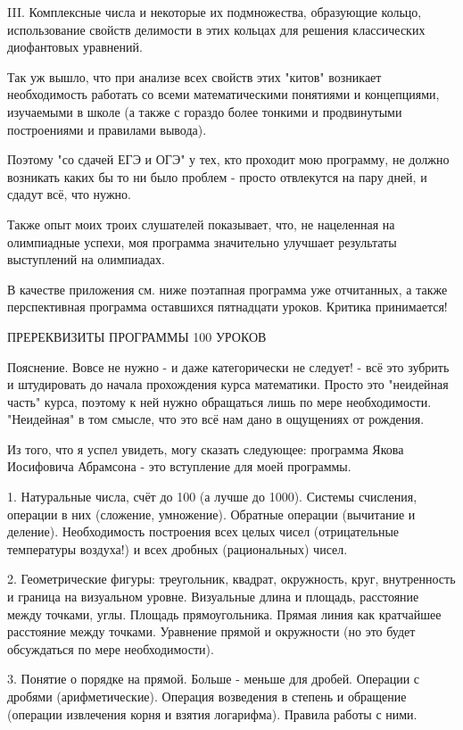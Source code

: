 III. Комплексные числа и некоторые их подмножества, образующие кольцо, использование
свойств делимости в этих кольцах для решения классических диофантовых уравнений.

Так уж вышло, что при анализе всех свойств этих "китов" возникает необходимость
работать со всеми математическими понятиями и концепциями, изучаемыми в школе
(а также с гораздо более тонкими и продвинутыми построениями и правилами вывода).

Поэтому "со сдачей ЕГЭ и ОГЭ" у тех, кто проходит мою программу, не должно возникать
каких бы то ни было проблем - просто отвлекутся на пару дней, и сдадут всё, что нужно.

Также опыт моих троих слушателей показывает, что, не нацеленная на олимпиадные
успехи, моя программа значительно улучшает результаты выступлений на олимпиадах.

В качестве приложения см. ниже поэтапная программа уже отчитанных, а также
перспективная программа оставшихся пятнадцати уроков. Критика принимается!

ПРЕРЕКВИЗИТЫ ПРОГРАММЫ 100 УРОКОВ

Пояснение. Вовсе не нужно - и даже категорически не следует! -
всё это зубрить и штудировать до начала прохождения курса
математики. Просто это "неидейная часть" курса, поэтому к ней
нужно обращаться лишь по мере необходимости. "Неидейная" в 
том смысле, что это всё нам дано в ощущениях от рождения.

Из того, что я успел увидеть, могу сказать следующее: программа 
Якова Иосифовича Абрамсона - это вступление для моей программы.

1. Натуральные числа, счёт до 100 (а лучше до 1000). Системы счисления,
операции в них (сложение, умножение). Обратные операции (вычитание и
деление). Необходимость построения всех целых чисел (отрицательные
температуры воздуха!) и всех дробных (рациональных) чисел.

2. Геометрические фигуры: треугольник, квадрат, окружность, круг,
внутренность и граница на визуальном уровне. Визуальные длина и
площадь, расстояние между точками, углы. Площадь прямоугольника.
Прямая линия как кратчайшее расстояние между точками. Уравнение
прямой и окружности (но это будет обсуждаться по мере необходимости).

3. Понятие о порядке на прямой. Больше - меньше для дробей. Операции
с дробями (арифметические). Операция возведения в степень и обращение 
(операции извлечения корня и взятия логарифма). Правила работы с ними.

